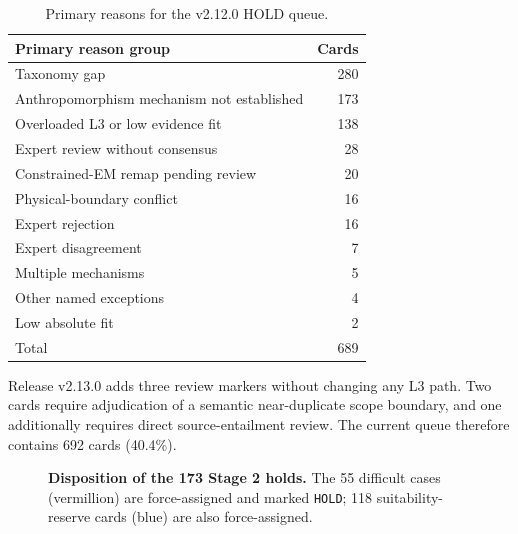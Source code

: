\documentclass[11pt,a4paper]{article}
\newcommand{\code}[1]{\texttt{#1}}
\begin{document}
\begin{appendices}
\begin{table}[H]
\centering
\caption{Primary reasons for the v2.12.0 HOLD queue.}
\label{tab:holdreasons}
\small
\begin{tabular}{lr}
\toprule
Primary reason group & Cards \\
\midrule
Taxonomy gap & 280 \\
Anthropomorphism mechanism not established & 173 \\
Overloaded L3 or low evidence fit & 138 \\
Expert review without consensus & 28 \\
Constrained-EM remap pending review & 20 \\
Physical-boundary conflict & 16 \\
Expert rejection & 16 \\
Expert disagreement & 7 \\
Multiple mechanisms & 5 \\
Other named exceptions & 4 \\
Low absolute fit & 2 \\
\midrule
Total & 689 \\
\bottomrule
\end{tabular}
\end{table}

Release v2.13.0 adds three review markers without changing any L3 path. Two
cards require adjudication of a semantic near-duplicate scope boundary, and
one additionally requires direct source-entailment review. The current queue
therefore contains 692 cards (40.4\%).

\begin{figure}[H]
\centering
{}
\caption{\textbf{Disposition of the 173 Stage 2 holds.} The 55 difficult cases
(vermillion) are force-assigned and marked \code{HOLD}; 118 suitability-reserve
cards (blue) are also force-assigned.}
\label{fig:holds}
\end{figure}


\end{appendices}
\end{document}
